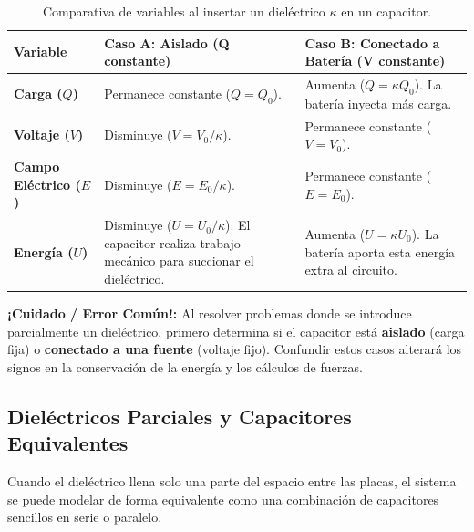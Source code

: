 \documentclass[12pt, a4paper]{article}
\newcommand{\alerta}[1]{\begin{alertabox}\textbf{¡Cuidado / Error Común!:} #1\end{alertabox}}
\begin{document}
\begin{table}[htbp]
\centering
\caption{Comparativa de variables al insertar un dieléctrico $\kappa$ en un capacitor.}
\begin{tabularx}{\textwidth}{lXX}
\toprule
\textbf{Variable} & \textbf{Caso A: Aislado (Q constante)} & \textbf{Caso B: Conectado a Batería (V constante)} \\
\midrule
\textbf{Carga ($Q$)} & Permanece constante ($Q = Q_0$). & Aumenta ($Q = \kappa Q_0$). La batería inyecta más carga. \\
\textbf{Voltaje ($V$)} & Disminuye ($V = V_0 / \kappa$). & Permanece constante ($V = V_0$). \\
\textbf{Campo Eléctrico ($E$)} & Disminuye ($E = E_0 / \kappa$). & Permanece constante ($E = E_0$). \\
\textbf{Energía ($U$)} & Disminuye ($U = U_0 / \kappa$). El capacitor realiza trabajo mecánico para succionar el dieléctrico. & Aumenta ($U = \kappa U_0$). La batería aporta esta energía extra al circuito. \\
\bottomrule
\end{tabularx}
\label{tab:dielectricos}
\end{table}

\alerta{Al resolver problemas donde se introduce parcialmente un dieléctrico, primero determina si el capacitor está \textbf{aislado} (carga fija) o \textbf{conectado a una fuente} (voltaje fijo). Confundir estos casos alterará los signos en la conservación de la energía y los cálculos de fuerzas.}

\subsection{Dieléctricos Parciales y Capacitores Equivalentes}
Cuando el dieléctrico llena solo una parte del espacio entre las placas, el sistema se puede modelar de forma equivalente como una combinación de capacitores sencillos en serie o paralelo.
\end{document}
